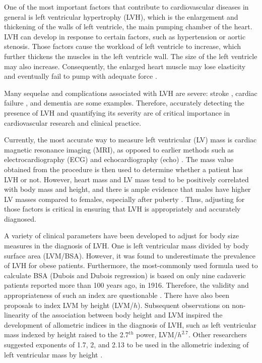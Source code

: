 \documentclass [12pt, proquest] {uwthesis}[2016/11/22]
\begin{document}
One of the most important factors that contribute to cardiovascular diseases in general is left ventricular hypertrophy (LVH), which is the enlargement and thickening of the walls of left ventricle, the main pumping chamber of the heart. LVH can develop in response to certain factors, such as hypertension or aortic stenosis. Those factors cause the workload of left ventricle to increase, which further thickens the muscles in the left ventricle wall. The size of the left ventricle may also increase. Consequently, the enlarged heart muscle may lose elasticity and eventually fail to pump with adequate force \cite{LVH}.

Many sequelae and complications associated with LVH are severe: stroke \cite{PV2006}, cardiac failure \cite{AG2006}, and dementia \cite{ARICNCS} are some examples. Therefore, accurately detecting the presence of LVH and quantifying its severity are of critical importance in cardiovascular research and clinical practice.

Currently, the most accurate way to measure left ventricular (LV) mass is cardiac magnetic resonance imaging (MRI), as opposed to earlier methods such as electrocardiography (ECG) and echocardiography (echo) \cite{CMRI}. The mass value obtained from the procedure is then used to determine whether a patient has LVH or not. However, heart mass and LV mass tend to be positively correlated with body mass and height, and there is ample evidence that males have higher LV masses compared to females, especially after puberty \cite{GdS1995}. Thus, adjusting for those factors is critical in ensuring that LVH is appropriately and accurately diagnosed.

A variety of clinical parameters have been developed to adjust for body size measures in the diagnosis of LVH. One is left ventricular mass divided by body surface area (LVM/BSA). However, it was found to underestimate the prevalence of LVH for obese patients. Furthermore, the most-commonly used formula used to calculate BSA (Dubois and Dubois regression) is based on only nine cadaveric patients reported more than 100 years ago, in 1916. Therefore, the validity and appropriateness of such an index are questionable \cite{AA2012}. There have also been proposals to index LVM by height (LVM/$h$). Subsequent observations on non-linearity of the association between body height and LVM inspired the development of allometric indices in the diagnosis of LVH, such as left ventricular mass indexed by height raised to the 2.7$^{th}$ power, LVM/$h^{2.7}$. Other researchers suggested exponents of 1.7, 2, and 2.13 to be used in the allometric indexing of left ventricular mass by height \cite{AA2012}.
\end{document}
